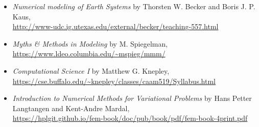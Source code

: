 \begin{itemize}
\item {\it Numerical modeling of Earth Systems} by Thorsten W. Becker and Boris J. P. Kaus,\\ 
\url{http://www-udc.ig.utexas.edu/external/becker/teaching-557.html}

\item {\it Myths \& Methods in Modeling} by M. Spiegelman,\\
 \url{https://www.ldeo.columbia.edu/~mspieg/mmm/}

\item {\it Computational Science I} by Matthew G. Knepley,\\
 \url{https://cse.buffalo.edu/~knepley/classes/caam519/Syllabus.html}

\item {\it Introduction to Numerical Methods for Variational Problems} by Hans Petter Langtangen and 
Kent-Andre Mardal, \\
\url{https://hplgit.github.io/fem-book/doc/pub/book/pdf/fem-book-4print.pdf}
\end{itemize}

